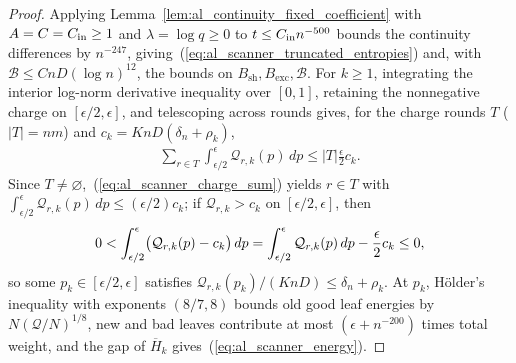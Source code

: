 \begin{proof}\leanok
    Applying Lemma~\ref{lem:al_continuity_fixed_coefficient} with
    $A=C=C_{\rm in}\ge1$ and $\lambda=\log q\ge0$ to $t\le C_{\rm in}n^{-500}$
    bounds the continuity differences by $n^{-247}$, giving~(\ref{eq:al_scanner_truncated_entropies})
    and, with $\mathcal B\le CnD(\log n)^{12}$, the bounds on
    $B_{\mathrm{sh}},B_{\mathrm{exc}},\mathcal B$.
    For $k\ge1$, integrating the interior log-norm derivative inequality over
    $[0,1]$, retaining the nonnegative charge on $[\epsilon/2,\epsilon]$, and
    telescoping across rounds gives, for the charge rounds $T$ ($|T|=nm$) and
    $c_k=KnD(\delta_n+\rho_k)$,
    \begin{align}
        \sum_{r\in T}\int_{\epsilon/2}^{\epsilon}\mathcal Q_{r,k}(p)\,dp
        \le |T|\frac{\epsilon}{2}c_k.
        \label{eq:al_scanner_charge_sum}
    \end{align}
    Since $T\ne\varnothing$,~(\ref{eq:al_scanner_charge_sum}) yields $r\in T$
    with $\int_{\epsilon/2}^{\epsilon}\mathcal Q_{r,k}(p)\,dp\le(\epsilon/2)c_k$;
    if $\mathcal Q_{r,k}>c_k$ on $[\epsilon/2,\epsilon]$, then
    \begin{align}
        0<\int_{\epsilon/2}^{\epsilon}\bigl(\mathcal Q_{r,k}(p)-c_k\bigr)\,dp
        =\int_{\epsilon/2}^{\epsilon}\mathcal Q_{r,k}(p)\,dp-\frac{\epsilon}{2}c_k\le0,
        \notag
    \end{align}
    so some $p_k\in[\epsilon/2,\epsilon]$ satisfies
    $\mathcal Q_{r,k}(p_k)/(KnD)\le\delta_n+\rho_k$. At $p_k$, H\"older's
    inequality with exponents $(8/7,8)$ bounds old good leaf energies by
    $N(\mathcal Q/N)^{1/8}$, new and bad leaves contribute at most
    $(\epsilon+n^{-200})$ times total weight, and the gap of $\overline H_k$
    gives~(\ref{eq:al_scanner_energy}).
\end{proof}

